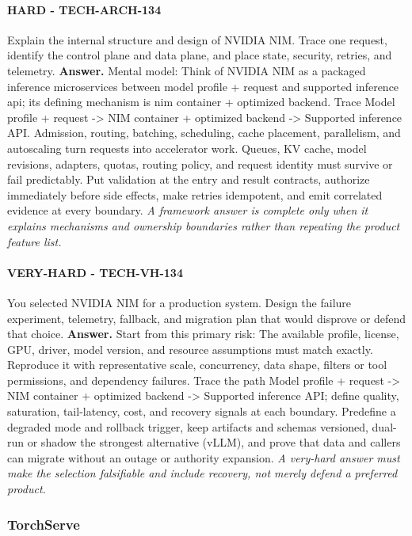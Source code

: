 \paragraph{HARD - TECH-ARCH-134} Explain the internal structure and design of NVIDIA NIM. Trace one request, identify the control plane and data plane, and place state, security, retries, and telemetry.
\textbf{Answer.} Mental model: Think of NVIDIA NIM as a packaged inference microservices between model profile + request and supported inference api; its defining mechanism is nim container + optimized backend. Trace Model profile + request -> NIM container + optimized backend -> Supported inference API. Admission, routing, batching, scheduling, cache placement, parallelism, and autoscaling turn requests into accelerator work. Queues, KV cache, model revisions, adapters, quotas, routing policy, and request identity must survive or fail predictably. Put validation at the entry and result contracts, authorize immediately before side effects, make retries idempotent, and emit correlated evidence at every boundary.
\textit{A framework answer is complete only when it explains mechanisms and ownership boundaries rather than repeating the product feature list.}
\paragraph{VERY-HARD - TECH-VH-134} You selected NVIDIA NIM for a production system. Design the failure experiment, telemetry, fallback, and migration plan that would disprove or defend that choice.
\textbf{Answer.} Start from this primary risk: The available profile, license, GPU, driver, model version, and resource assumptions must match exactly. Reproduce it with representative scale, concurrency, data shape, filters or tool permissions, and dependency failures. Trace the path Model profile + request -> NIM container + optimized backend -> Supported inference API; define quality, saturation, tail-latency, cost, and recovery signals at each boundary. Predefine a degraded mode and rollback trigger, keep artifacts and schemas versioned, dual-run or shadow the strongest alternative (vLLM), and prove that data and callers can migrate without an outage or authority expansion.
\textit{A very-hard answer must make the selection falsifiable and include recovery, not merely defend a preferred product.}
\subsubsection*{TorchServe}
